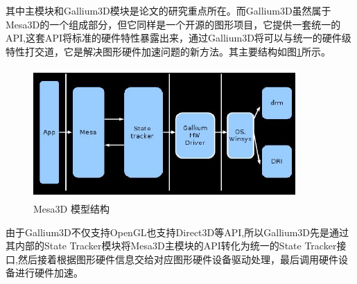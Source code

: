 其中主模块和Gallium3D模块是论文的研究重点所在。而Gallium3D虽然属于Mesa3D的一个组成部分，但它同样是一个开源的图形项目，它提供一套统一的API,这套API将标准的硬件特性暴露出来，通过Gallium3D将可以与统一的硬件级特性打交道，它是解决图形硬件加速问题的新方法。其主要结构如图\ref{fig:Gallium3D}所示。

\begin{figure}[H] 
  \centering
  \includegraphics[width=10cm,height=5cm]{figures/chap02/Gallium3D}
  \caption{Mesa3D 模型结构}
  \label{fig:Gallium3D}
\end{figure}

由于Gallium3D不仅支持OpenGL也支持Direct3D等API,所以Gallium3D先是通过其内部的State Tracker模块将Mesa3D主模块的API转化为统一的State Tracker接口,然后接着根据图形硬件信息交给对应图形硬件设备驱动处理，最后调用硬件设备进行硬件加速。
